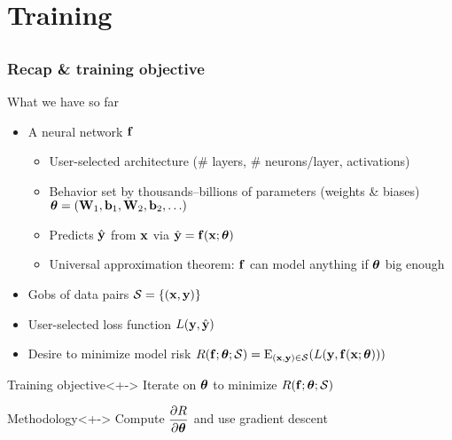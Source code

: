 \section{Training}

\subsection{}

\begin{frame}
    \frametitle{Recap \& training objective}

    What we have so far
    \begin{itemize}
        \item<+-> A neural network $\mathbf{f}$
        \begin{itemize}
            \item User-selected \alert{architecture} (\# layers, \# neurons/layer, activations)
            \item Behavior set by thousands--billions of \alert{parameters} (weights \& biases) $\bm{\theta} = (\mathbf{W}_1, \mathbf{b}_1, \mathbf{W}_2, \mathbf{b}_2, \ldots)$
            \item \alert{Predicts} $\hat{\mathbf{y}}$ from $\mathbf{x}$ via $\hat{\mathbf{y}} = \mathbf{f}(\mathbf{x}; \bm{\theta})$
            \item \alert{Universal approximation theorem}: $\mathbf{f}$ can model anything if $\bm{\theta}$ big enough
        \end{itemize}
        \item<+-> Gobs of \alert{data} pairs $\mathcal{S} = \{(\mathbf{x}, \mathbf{y})\}$
        \item<+-> User-selected \alert{loss function} $L(\mathbf{y}, \hat{\mathbf{y}})$
        \item<+-> Desire to minimize \alert{model risk} $R(\mathbf{f}; \bm{\theta}; \mathcal{S}) = \operatorname{\mathrm{E}}_{(\mathbf{x}, \mathbf{y}) \in \mathcal{S}}(L(\mathbf{y}, \mathbf{f}(\mathbf{x}; \bm{\theta})))$
    \end{itemize}

    \begin{block}{Training objective}<+->
        Iterate on $\bm{\theta}$ to minimize $R(\mathbf{f}; \bm{\theta}; \mathcal{S})$
    \end{block}

    \begin{block}{Methodology}<+->
        Compute $\dfrac{\partial R}{\partial \bm{\theta}}$ and use gradient descent
    \end{block}
\end{frame}

